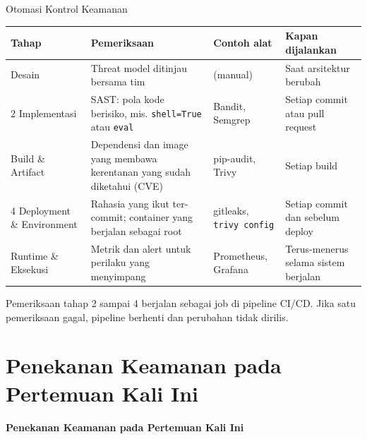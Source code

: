 \documentclass[aspectratio=169, table]{beamer}
\begin{document}
\begin{frame}{Otomasi Kontrol Keamanan}
	\vspace{4pt}
	\centering
	\scriptsize
	\setlength{\arrayrulewidth}{0.4pt}
	\begin{tabular}{|>{\raggedright\arraybackslash}p{}|>{\raggedright\arraybackslash}p{}|>{\raggedright\arraybackslash}p{}|>{\raggedright\arraybackslash}p{}|}
	\hline
	\rowcolor{blue!12}
	\textbf{Tahap} & \textbf{Pemeriksaan} & \textbf{Contoh alat} & \textbf{Kapan dijalankan} \\
	\hline
	1 Desain & Threat model ditinjau bersama tim & (manual) & Saat arsitektur berubah \\
	\hline
	\rowcolor{black!4}
	2 Implementasi & SAST: pola kode berisiko, mis. \texttt{shell=True} atau \texttt{eval} & Bandit, Semgrep & Setiap commit atau pull request \\
	\hline
	3 Build \& Artifact & Dependensi dan image yang membawa kerentanan yang sudah diketahui (CVE) & pip-audit, Trivy & Setiap build \\
	\hline
	\rowcolor{black!4}
	4 Deployment \& Environment & Rahasia yang ikut ter-commit; container yang berjalan sebagai root & gitleaks, \texttt{trivy config} & Setiap commit dan sebelum deploy \\
	\hline
	5 Runtime \& Eksekusi & Metrik dan alert untuk perilaku yang menyimpang & Prometheus, Grafana & Terus-menerus selama sistem berjalan \\
	\hline
	\end{tabular}

	\vspace{8pt}
	{\footnotesize Pemeriksaan tahap 2 sampai 4 berjalan sebagai job di pipeline CI/CD. Jika satu pemeriksaan gagal, pipeline berhenti dan perubahan tidak dirilis.}
\end{frame}

\section{Penekanan Keamanan pada Pertemuan Kali Ini}
	\begin{frame}{\hfill}
		\centering
		\Huge{\textbf{Penekanan Keamanan pada Pertemuan Kali Ini}}
	\end{frame}
\end{document}
